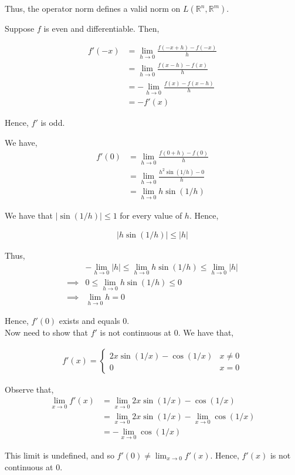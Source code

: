 \documentclass[12pt]{article}
\newenvironment{problem}[2][Problem]{\begin{trivlist}
\item[\hskip \labelsep {\bfseries #1}\hskip \labelsep {\bfseries #2.}]}{\end{trivlist}}
\begin{document}
Thus, the operator norm defines a valid norm on $L(\mathbb{R}^n, \mathbb{R}^m)$.

\begin{problem}{3}
\end{problem}


\begin{problem}{4}
\end{problem}

Suppose $f$ is even and differentiable. Then,

\begin{align*}
f'(-x) &= \lim_{h \to 0} \frac{f(-x+h) - f(-x)}{h}\\
&= \lim_{h \to 0} \frac{f(x-h) - f(x)}{h}\\
&= - \lim_{h \to 0} \frac{f(x) - f(x-h)}{h}\\
&= -f'(x)
\end{align*}

Hence, $f'$ is odd.


\begin{problem}{5}
\end{problem}

We have,
\begin{align*}
f'(0) &= \lim_{h \to 0} \frac{f(0 + h) - f(0)}{h}\\
&= \lim_{h \to 0} \frac{h^2 \sin(1/h) - 0}{h}\\
&= \lim_{h \to 0} h \sin(1/h)
\end{align*}

We have that $|\sin(1/h)| \leq 1$ for every value of $h$. Hence,

\begin{align*}
|h \sin(1/h)| \leq |h|
\end{align*}

Thus,
\begin{align*}
&- \lim_{h \to 0} |h| \leq \lim_{h \to 0} h \sin(1/h) \leq \lim_{h \to 0} |h|\\
\implies &0 \leq \lim_{h \to 0} h \sin(1/h) \leq 0\\
\implies &\lim_{h \to 0} h = 0
\end{align*}

Hence, $f'(0)$ exists and equals $0$.\\

Now need to show that $f'$ is not continuous at $0$. We have that,

\begin{align*}
f'(x) = \begin{cases} 
      2x \sin(1/x) - \cos(1/x) & x \neq 0 \\
      0 & x = 0
   \end{cases}
\end{align*}

Observe that,
\begin{align*}
\lim_{x \to 0} f'(x) &= \lim_{x \to 0} 2x \sin(1/x) - \cos(1/x)\\
&= \lim_{x \to 0} 2x \sin(1/x) - \lim_{x \to 0} \cos(1/x)\\
&= - \lim_{x \to 0} \cos(1/x)
\end{align*}

This limit is undefined, and so $f'(0) \neq \lim_{x \to 0} f'(x)$. Hence, $f'(x)$ is not continuous at $0$.
\end{document}
